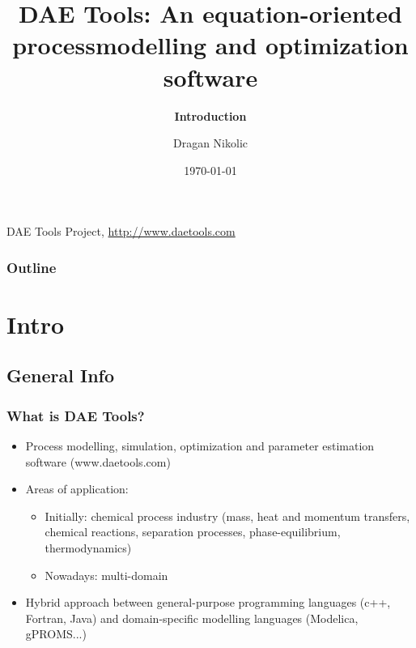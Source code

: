 \documentclass{beamer}
\begin{document}
\title[\textbf{DAE Tools} - Introduction]{\textbf{DAE Tools}: An equation-oriented process\linebreak modelling and optimization software}
\subtitle{\textbf{Introduction}}
\author{Dragan Nikolic}
\institute
{
  DAE Tools Project, \url{http://www.daetools.com}
}
\date{\today} 


\begin{frame}
\titlepage
\end{frame}

\begin{frame}
\frametitle{Outline}
\tableofcontents[currentsubsection, 
                 hideothersubsections, 
                 sectionstyle=show, 
                 subsectionstyle=hide]
\end{frame} 


\section{Intro}

\subsection{General Info}
\begin{frame}
\frametitle{What is DAE Tools?} 
\begin{block}{}
\begin{itemize}
  \item Process modelling, simulation, optimization and parameter estimation software (www.daetools.com)
  \item Areas of application:
    \begin{itemize}
      \item Initially: chemical process industry (mass, heat and momentum transfers, chemical reactions, separation processes, phase-equilibrium, thermodynamics)
      \item Nowadays: multi-domain
    \end{itemize}
  \item Hybrid approach between general-purpose programming languages (c++, Fortran, Java) and domain-specific modelling languages (Modelica, gPROMS...)
\end{itemize}
\end{block}
\end{frame}
\end{document}

